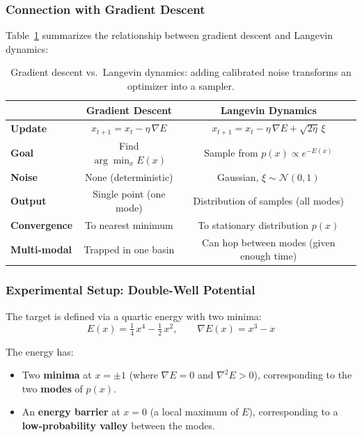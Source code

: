 \documentclass[12pt, a4paper]{article}
\begin{document}
\subsubsection{Connection with Gradient Descent}

Table~\ref{tab:gd_vs_langevin} summarizes the relationship
between gradient descent and Langevin dynamics:

\begin{table}[H]
    \centering
    \begin{tabular}{lcc}
        \toprule
            & \textbf{Gradient Descent}
            & \textbf{Langevin Dynamics} \\
        \midrule
        \textbf{Update}
            & $x_{t+1} = x_t - \eta\,\nabla E$
            & $x_{t+1} = x_t - \eta\,\nabla E + \sqrt{2\eta}\,\xi$ \\
        \textbf{Goal}
            & Find $\arg\min_x E(x)$
            & Sample from $p(x) \propto e^{-E(x)}$ \\
        \textbf{Noise}
            & None (deterministic)
            & Gaussian, $\xi \sim \mathcal{N}(0,1)$ \\
        \textbf{Output}
            & Single point (one mode)
            & Distribution of samples (all modes) \\
        \textbf{Convergence}
            & To nearest minimum
            & To stationary distribution $p(x)$ \\
        \textbf{Multi-modal}
            & Trapped in one basin
            & Can hop between modes (given enough time) \\
        \bottomrule
    \end{tabular}
    \caption{Gradient descent vs.\ Langevin dynamics:
             adding calibrated noise transforms an optimizer
             into a sampler.}
    \label{tab:gd_vs_langevin}
\end{table}

\subsubsection{Experimental Setup: Double-Well Potential}

The target is defined via a quartic energy with two minima:
\begin{equation}
    E(x) = \tfrac{1}{4}\,x^{4} - \tfrac{1}{2}\,x^{2},
    \qquad
    \nabla E(x) = x^{3} - x
    \label{eq:double_well}
\end{equation}

The energy has:
\begin{itemize}
    \item Two \textbf{minima} at $x = \pm 1$ (where
          $\nabla E = 0$ and $\nabla^2 E > 0$), corresponding
          to the two \textbf{modes} of $p(x)$.
    \item An \textbf{energy barrier} at $x = 0$ (a local
          maximum of $E$), corresponding to a
          \textbf{low-probability valley} between the modes.
\end{itemize}
\end{document}

